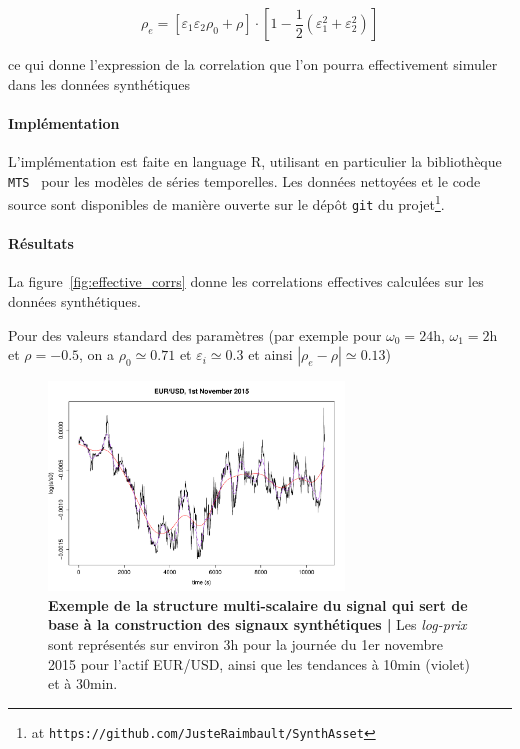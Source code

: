 \begin{equation}
\label{eq:eff_corr}
\rho_e = \left[ \varepsilon_1 \varepsilon_2 \rho_0 + \rho \right] \cdot \left[ 1 - \frac{1}{2}\left(\varepsilon_1^2 + \varepsilon_2^2 \right) \right]
\end{equation}

ce qui donne l'expression de la correlation que l'on pourra effectivement simuler dans les données synthétiques






\paragraph{Implémentation}

L'implémentation est faite en language R, utilisant en particulier la bibliothèque \texttt{MTS}~\cite{Tsay:2015xy} pour les modèles de séries temporelles. Les données nettoyées et le code source sont disponibles de manière ouverte sur le dépôt \texttt{git} du projet\footnote{at \texttt{https://github.com/JusteRaimbault/SynthAsset}}.

\paragraph{Résultats}

La figure~\ref{fig:effective_corrs} donne les correlations effectives calculées sur les données synthétiques.

Pour des valeurs standard des paramètres (par exemple pour $\omega_0=24\textrm{h}$, $\omega_1=2\textrm{h}$ et $\rho=-0.5$, on a $\rho_0\simeq 0.71$ et $\varepsilon_i \simeq 0.3$ et ainsi $\left| \rho_e - \rho \right|\simeq 0.13$)




\begin{figure}
\centering
\includegraphics[width=0.7\textwidth]{figures/asset/ex_filtering}
\caption{\textbf{Exemple de la structure multi-scalaire du signal qui sert de base à la construction des signaux synthétiques | } Les \emph{log-prix} sont représentés sur environ 3h pour la journée du 1er novembre 2015 pour l'actif EUR/USD, ainsi que les tendances à 10min (violet) et à 30min.}
\label{fig:example_signal}
\end{figure}




